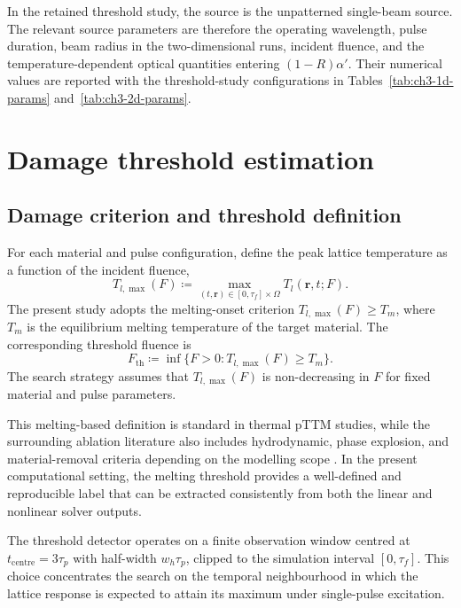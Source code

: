 In the retained threshold study, the source is the unpatterned
single-beam source. The relevant source parameters are therefore the
operating wavelength, pulse duration, beam radius in the two-dimensional
runs, incident fluence, and the temperature-dependent optical quantities
entering \((1-R)\alpha'\). Their numerical values are reported with the
threshold-study configurations in Tables~\ref{tab:ch3-1d-params}
and~\ref{tab:ch3-2d-params}.

\section{Damage threshold estimation}
\label{sec:ch3-ablation}

\subsection{Damage criterion and threshold definition}
\label{sec:ch3-ablation-criterion}

For each material and pulse configuration, define the peak lattice
temperature as a function of the incident fluence,
\[
    T_{l,\max}(F)
    \coloneqq
    \max_{(t, \mathbf{r}) \in [0, \tau_f] \times \Omega}
    T_l(\mathbf{r}, t; F).
\]
The present study adopts the melting-onset criterion
\(T_{l,\max}(F) \geq T_m\), where \(T_m\) is the equilibrium melting
temperature of the target material. The corresponding threshold fluence is
\begin{equation}
    F_{\mathrm{th}}
    \coloneqq
    \inf\{F > 0 : T_{l,\max}(F) \geq T_m\}.
    \label{eq:ch3-threshold}
\end{equation}
The search strategy assumes that \(T_{l,\max}(F)\) is non-decreasing in
\(F\) for fixed material and pulse parameters.

This melting-based definition is standard in thermal pTTM studies, while
the surrounding ablation literature also includes hydrodynamic, phase
explosion, and material-removal criteria depending on the modelling scope
\cite{Hashida_2001,Gamaly_2002,Forster_2021,Cheng_2016,Zhou_2022,Wang_2024}.
In the present computational setting, the melting threshold provides a
well-defined and reproducible label that can be extracted consistently
from both the linear and nonlinear solver outputs.

The threshold detector operates on a finite observation window centred at
\(t_{\mathrm{centre}} = 3\tau_p\) with half-width \(w_h \tau_p\), clipped to the
simulation interval \([0, \tau_f]\). This choice concentrates
the search on the temporal neighbourhood in which the lattice response is
expected to attain its maximum under single-pulse excitation.


